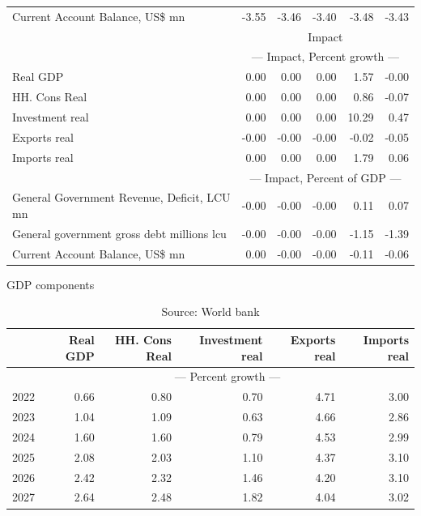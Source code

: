 \documentclass{article}
\begin{document}
\begin{table}[ht]
\begin{tabular}{lrrrrr}
Current Account Balance, US\$ mn & -3.55 & -3.46 & -3.40 & -3.48 & -3.43 \\
&\multicolumn{5}{c}{{Impact}}                          \\
&\multicolumn{5}{c}{{--- Impact, Percent growth ---}}                          \\
Real GDP & 0.00 & 0.00 & 0.00 & 1.57 & -0.00 \\
HH. Cons Real & 0.00 & 0.00 & 0.00 & 0.86 & -0.07 \\
Investment real & 0.00 & 0.00 & 0.00 & 10.29 & 0.47 \\
Exports real & -0.00 & -0.00 & -0.00 & -0.02 & -0.05 \\
Imports real & 0.00 & 0.00 & 0.00 & 1.79 & 0.06 \\
&\multicolumn{5}{c}{{--- Impact, Percent of GDP ---}}                          \\
General Government Revenue, Deficit, LCU mn & -0.00 & -0.00 & -0.00 & 0.11 & 0.07 \\
General government gross debt millions lcu & -0.00 & -0.00 & -0.00 & -1.15 & -1.39 \\
Current Account Balance, US\$ mn & 0.00 & -0.00 & -0.00 & -0.11 & -0.06 \\
\bottomrule
\end{tabular}
\end{table}

\begin{table}[ht]
\caption{GDP components}
\begin{tabular}{lrrrrr}
\toprule
 & Real GDP & HH. Cons Real & Investment real & Exports real & Imports real \\
\midrule
&\multicolumn{5}{c}{{--- Percent growth ---}}\\
2022 & 0.66 & 0.80 & 0.70 & 4.71 & 3.00 \\
2023 & 1.04 & 1.09 & 0.63 & 4.66 & 2.86 \\
2024 & 1.60 & 1.60 & 0.79 & 4.53 & 2.99 \\
2025 & 2.08 & 2.03 & 1.10 & 4.37 & 3.10 \\
2026 & 2.42 & 2.32 & 1.46 & 4.20 & 3.10 \\
2027 & 2.64 & 2.48 & 1.82 & 4.04 & 3.02 \\
\bottomrule
\end{tabular}
\caption*{Source: World bank }
\end{table}
\end{document}
